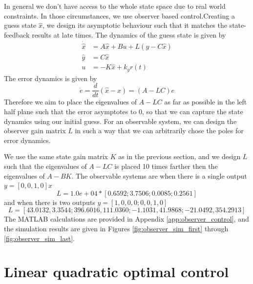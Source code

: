 \documentclass[12pt]{article}
\numberwithin{equation}{section}
\begin{document}
In general we don't have access to the whole state space due to real world constraints. In those circumstances, we use observer based control.Creating a guess state $\hat{x}$, we design its asymptotic behaviour such that it matches the state-feedback results at late times. The dynamics of the guess state is given by
\begin{align}
    \dot{\hat{x}} &= A \hat{x} + B u + L (y - C \hat{x})\\
    \hat{y} &= C\hat{x}\\
    u &= -K\hat{x} + k_g r(t)
\end{align}
The error dynamics is given by
\begin{equation}
    \dot{e} = \frac{d}{dt}(\hat{x}-x) = (A-LC)e
\end{equation}
Therefore we aim to place the eigenvalues of $A-LC$ as far as possible in the left half plane such that the error asymptotes to 0, so that we can capture the state dynamics using our initial guess. For an observable system, we can design the observer gain matrix $L$ in such a way that we can arbitrarily chose the poles for error dynamics.

We use the same state gain matrix $K$ as in the previous section, and we design $L$ such that the eigenvalues of $A-LC$ is placed 10 times farther then the eigenvalues of $A-BK$. The observable systems are when there is a single output $y = [0,0,1,0]x$
\begin{equation}
    L = 1.0e+04 *[0.6592;3.7506;0.0085;0.2561]
\end{equation}
and when there is two outputs $y=[1,0,0,0;0,0,1,0]$
\begin{equation}
    L =[43.0132,3.3544;396.6016,111.0360;-1.1031,41.9868;-21.0492,354.2913]
\end{equation}
The MATLAB calculations are provided in Appendix \ref{app:observer_control}, and the simulation results are given in Figures \ref{fig:observer_sim_first} through \ref{fig:observer_sim_last}.

\section{Linear quadratic optimal control}
\end{document}
